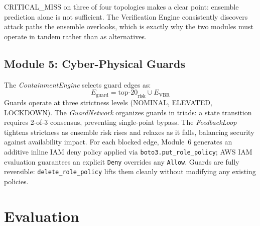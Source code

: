 \documentclass[conference,a4paper]{IEEEtran}
\begin{document}
\begin{table}[h]
\centering
\caption{Verification Engine Results on Synthetic Topologies}
\label{tab:verification}
\end{table}

CRITICAL\_MISS on three of four topologies makes a clear point:
ensemble prediction alone is not sufficient. The Verification Engine
consistently discovers attack paths the ensemble overlooks, which is
exactly why the two modules must operate in tandem rather than as
alternatives.

\subsection{Module 5: Cyber-Physical Guards}

The \textit{ContainmentEngine} selects guard edges as:
\[
  E_{\text{guard}} = \text{top-20}_{\text{risk}} \cup E_{\text{VBR}}
\]
Guards operate at three strictness levels (NOMINAL, ELEVATED, LOCKDOWN).
The \textit{GuardNetwork} organizes guards in triads: a state transition
requires 2-of-3 consensus, preventing single-point bypass.
The \textit{FeedbackLoop} tightens strictness as ensemble risk rises and
relaxes as it falls, balancing security against availability impact.
For each blocked edge, Module~6 generates an additive inline IAM deny
policy applied via \texttt{boto3.put\_role\_policy}; AWS IAM evaluation
guarantees an explicit \texttt{Deny} overrides any \texttt{Allow}.
Guards are fully reversible: \texttt{delete\_role\_policy} lifts them
cleanly without modifying any existing policies.

\section{Evaluation}
\end{document}
